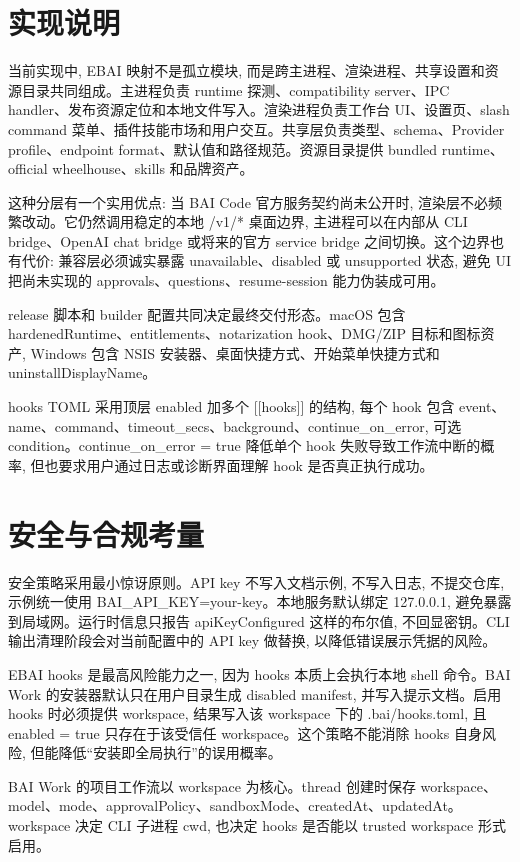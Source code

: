 \section{实现说明}
当前实现中, EBAI 映射不是孤立模块, 而是跨主进程、渲染进程、共享设置和资源目录共同组成。主进程负责 runtime 探测、compatibility server、IPC handler、发布资源定位和本地文件写入。渲染进程负责工作台 UI、设置页、slash command 菜单、插件技能市场和用户交互。共享层负责类型、schema、Provider profile、endpoint format、默认值和路径规范。资源目录提供 bundled runtime、official wheelhouse、skills 和品牌资产。

这种分层有一个实用优点: 当 BAI Code 官方服务契约尚未公开时, 渲染层不必频繁改动。它仍然调用稳定的本地 /v1/* 桌面边界, 主进程可以在内部从 CLI bridge、OpenAI chat bridge 或将来的官方 service bridge 之间切换。这个边界也有代价: 兼容层必须诚实暴露 unavailable、disabled 或 unsupported 状态, 避免 UI 把尚未实现的 approvals、questions、resume-session 能力伪装成可用。

release 脚本和 builder 配置共同决定最终交付形态。macOS 包含 hardenedRuntime、entitlements、notarization hook、DMG/ZIP 目标和图标资产, Windows 包含 NSIS 安装器、桌面快捷方式、开始菜单快捷方式和 uninstallDisplayName。

hooks TOML 采用顶层 enabled 加多个 [[hooks]] 的结构, 每个 hook 包含 event、name、command、timeout\_secs、background、continue\_on\_error, 可选 condition。continue\_on\_error = true 降低单个 hook 失败导致工作流中断的概率, 但也要求用户通过日志或诊断界面理解 hook 是否真正执行成功。

\section{安全与合规考量}
安全策略采用最小惊讶原则。API key 不写入文档示例, 不写入日志, 不提交仓库, 示例统一使用 BAI\_API\_KEY=your-key。本地服务默认绑定 127.0.0.1, 避免暴露到局域网。运行时信息只报告 apiKeyConfigured 这样的布尔值, 不回显密钥。CLI 输出清理阶段会对当前配置中的 API key 做替换, 以降低错误展示凭据的风险。

EBAI hooks 是最高风险能力之一, 因为 hooks 本质上会执行本地 shell 命令。BAI Work 的安装器默认只在用户目录生成 disabled manifest, 并写入提示文档。启用 hooks 时必须提供 workspace, 结果写入该 workspace 下的 .bai/hooks.toml, 且 enabled = true 只存在于该受信任 workspace。这个策略不能消除 hooks 自身风险, 但能降低“安装即全局执行”的误用概率。

BAI Work 的项目工作流以 workspace 为核心。thread 创建时保存 workspace、model、mode、approvalPolicy、sandboxMode、createdAt、updatedAt。workspace 决定 CLI 子进程 cwd, 也决定 hooks 是否能以 trusted workspace 形式启用。

